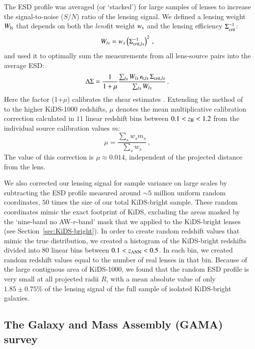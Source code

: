 \documentclass{aa}
\renewcommand{\Upsigma}{{\rm \Sigma}}
\renewcommand{\Updelta}{{\rm \Delta}}
\newcommand{\un}[1]{_{\rm #1}}
\begin{document}
The ESD profile was averaged (or `stacked') for large samples of lenses to increase the signal-to-noise ($S/N$) ratio of the lensing signal. We defined a lensing weight $W\un{ls}$ that depends on both the \emph{lens}fit weight $w\un{s}$ and the lensing efficiency $\Upsigma\un{crit}^{-1}$:
\begin{equation}
W_{ls} = w_s \left( \Upsigma_{{\rm crit},ls}^{-1} \right)^2 \, ,
\label{eq:weights}
\end{equation}
and used it to optimally sum the measurements from all lens-source pairs into the average ESD:
\begin{equation}
\Updelta\Upsigma = \frac{1}{1+\mu} \frac{\sum_{ls} W_{ls} \, \epsilon_{{\rm t},ls} \, \Upsigma_{{\rm crit},ls} }{ \sum_{ls}{W_{ls}} }  \, .
\label{eq:ESDmeasured}
\end{equation}
Here the factor (1+$\mu$) calibrates the shear estimates \cite[]{fenechconti2017,kannawadi2019}. Extending the method of \cite{dvornik2017} to the higher KiDS-1000 redshifts, $\mu$ denotes the mean multiplicative calibration correction calculated in $11$ linear redshift bins between \mbox{$0.1<z\un{B}<1.2$} from the individual source calibration values $m$:
\begin{equation}
\mu=\frac{\sum_{s} w_{s} m_{s}}{\sum_{s} w_{s}} \, ,
\label{eq:biascorr}
\end{equation}
The value of this correction is $\mu\approx0.014$, independent of the projected distance from the lens.

We also corrected our lensing signal for sample variance on large scales by subtracting the ESD profile measured around $\sim5$ million uniform random coordinates, $50$ times the size of our total KiDS-bright sample. These random coordinates mimic the exact footprint of KiDS, excluding the areas masked by the `nine-band no AW-$r$-band' mask that we applied to the KiDS-bright lenses (see Section~\ref{sec:KiDS-bright}). In order to create random redshift values that mimic the true distribution, we created a histogram of the KiDS-bright redshifts divided into $80$ linear bins between $0.1<z\un{ANN}<0.5$. In each bin, we created random redshift values equal to the number of real lenses in that bin. Because of the large contiguous area of KiDS-1000, we found that the random ESD profile is very small at all projected radii $R$, with a mean absolute value of only $1.85\pm0.75\%$ of the lensing signal of the full sample of isolated KiDS-bright galaxies.


\subsection{The Galaxy and Mass Assembly (GAMA) survey}
\label{sec:GAMA}
\end{document}
